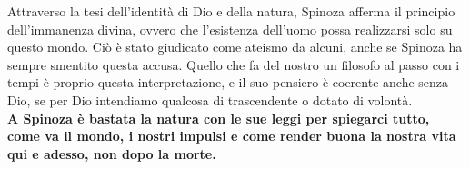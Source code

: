 Attraverso la tesi dell'identità di Dio e della natura, Spinoza afferma il principio dell'immanenza divina, ovvero che l'esistenza dell'uomo possa realizzarsi solo su questo mondo. Ciò è stato giudicato come ateismo da alcuni, anche se Spinoza ha sempre smentito questa accusa. Quello che fa del nostro un filosofo al passo con i tempi è proprio questa interpretazione, e il suo pensiero è coerente anche senza Dio, se per Dio intendiamo qualcosa di trascendente o dotato di volontà.\\
\textbf{A Spinoza è bastata la natura con le sue leggi per spiegarci tutto, come va il mondo, i nostri impulsi e come render buona la nostra vita qui e adesso, non dopo la morte.}
\newpage